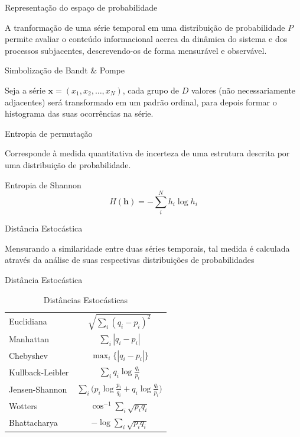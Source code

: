 \documentclass{beamer} %
\begin{document}
\begin{frame}{Representação do espaço de probabilidade}

A tranformação de uma série temporal em uma distribuição de probabilidade $P$ permite avaliar o conteúdo informacional acerca da dinâmica do sistema e dos processos subjacentes, descrevendo-os de forma mensurável e observável.

\end{frame}

\begin{frame}{Simbolização de Bandt \& Pompe}

Seja a série $\bm x = (x_1, x_2, \dots, x_N)$, cada grupo de $D$ valores (não necessariamente adjacentes) será transformado em um padrão ordinal, para depois formar o histograma das suas ocorrências na série.
 
\end{frame}

\begin{frame}{Entropia de permutação}

Corresponde à medida quantitativa  de incerteza  de uma estrutura descrita por uma distribuição de probabilidade.

\begin{outline}
\1 Entropia de Shannon
  \begin{equation}
  	H(\bm h) = -\sum_{i}^{N} h_i \log h_i
  \end{equation}
 \end{outline}

\end{frame}

\begin{frame}{Distância Estocástica}

Mensurando a similaridade entre duas séries temporais, tal medida é calculada através da análise de suas respectivas distribuições de probabilidades

\end{frame}

\begin{frame}{Distância Estocástica}

\begin{table}[hbt]
\caption{Distâncias Estocásticas}\label{Tab:Distancias}
\centering
\begin{tabular}{lc}\toprule
Euclidiana					& $ \sqrt{\sum_i(q_i-p_i)^{2}}$\\
Manhattan					& $ \sum_{i}|q_i-p_i|$\\
Chebyshev					& $ \max_i\{|q_i-p_i|\}$\\
Kullback-Leibler			& $ \sum_{i}q_i \log\frac{q_i}{p_i}$\\
Jensen-Shannon				& $ \sum_{i} \Big(p_i \log\frac{p_i}{q_i} + q_i \log\frac{q_i}{p_i}\Big)$\\
Wotters						& $ \cos^{-1}\sum_{i} \sqrt{p_i q_i}$ \\
Bhattacharya				& $ -\log\sum_{i}\sqrt{p_i q_i}$ \\
\bottomrule
\end{tabular}
\end{table}

\end{frame}
\end{document}
